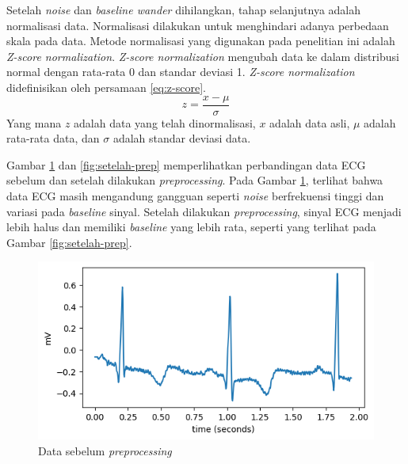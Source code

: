 Setelah \textit{noise} dan \textit{baseline wander} dihilangkan, tahap selanjutnya adalah normalisasi data.
Normalisasi dilakukan untuk menghindari adanya perbedaan skala pada data.
Metode normalisasi yang digunakan pada penelitian ini adalah \textit{Z-score normalization}.
\textit{Z-score normalization} mengubah data ke dalam distribusi normal dengan rata-rata 0 dan standar deviasi 1.
\textit{Z-score normalization} didefinisikan oleh persamaan \ref{eq:z-score}.
\begin{equation}
		z = \frac{x - \mu}{\sigma}
		\label{eq:z-score}
\end{equation}
Yang mana $z$ adalah data yang telah dinormalisasi, $x$ adalah data asli, $\mu$ adalah rata-rata data, dan $\sigma$ adalah standar deviasi data.


Gambar \ref{fig:sebelum-prep} dan \ref{fig:setelah-prep} memperlihatkan perbandingan data ECG sebelum dan setelah dilakukan \textit{preprocessing}.
Pada Gambar \ref{fig:sebelum-prep}, terlihat bahwa data ECG masih mengandung gangguan seperti \textit{noise} berfrekuensi tinggi dan variasi pada \textit{baseline} sinyal.
Setelah dilakukan \textit{preprocessing}, sinyal ECG menjadi lebih halus dan memiliki \textit{baseline} yang lebih rata, seperti yang terlihat pada Gambar \ref{fig:setelah-prep}.

\begin{figure}[H]
    \centering
    \includegraphics[width=0.6\linewidth]{./img/sebelum_prep.png}
	\caption{Data sebelum \textit{preprocessing}}
	\label{fig:sebelum-prep}
\end{figure}


